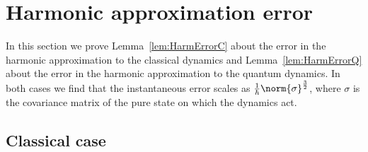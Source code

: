 \documentclass{article}
\numberwithin{equation}{section}
\begin{document}
\section{Harmonic approximation error}\label{sec:harmonic-error}

In this section we prove Lemma~\ref{lem:HarmErrorC} about the error in the harmonic approximation to the classical dynamics and Lemma~\ref{lem:HarmErrorQ} about the error in the harmonic approximation to the quantum dynamics.  In both cases we find that the instantaneous error scales as $\frac{1}{\hbar}\norm{\sigma}^{\frac{3}{2}}$, where $\sigma$ is the covariance matrix of the pure state on which the dynamics act.




\subsection{Classical case}\label{sec:harmonic-error-classical}
\end{document}
